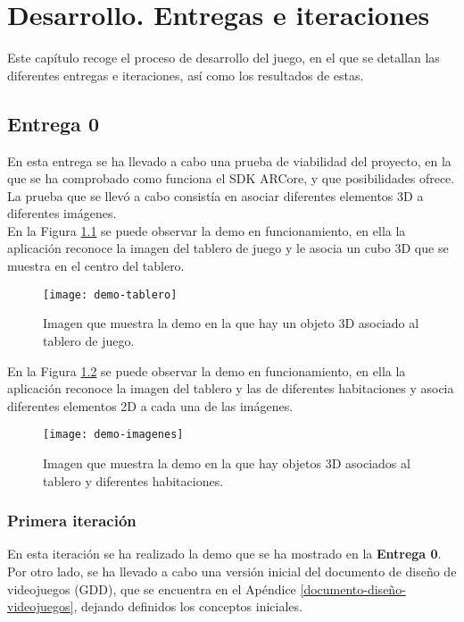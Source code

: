 \chapter{Desarrollo. Entregas e iteraciones}
\label{ch:desarrollo}
Este capítulo recoge el proceso de desarrollo del juego, en el que se detallan las diferentes entregas e iteraciones, así como los resultados de estas.

\section{Entrega 0}
En esta entrega se ha llevado a cabo una prueba de viabilidad del proyecto, en la que se ha comprobado como funciona el SDK ARCore, y que posibilidades ofrece. La prueba que se llevó a cabo consistía en asociar diferentes elementos 3D a diferentes imágenes.\\

En la Figura \ref{figura-demo-tablero} se puede observar la demo en funcionamiento, en ella la aplicación reconoce la imagen del tablero de juego y le asocia un cubo 3D que se muestra en el centro del tablero.

\begin{figure}[h]
  \centering
  \texttt{[image: demo-tablero]}
  \caption{Imagen que muestra la demo en la que hay un objeto 3D asociado al tablero de juego.}
  \label{figura-demo-tablero}
\end{figure}

En la Figura \ref{figura-demo-imagenes} se puede observar la demo en funcionamiento, en ella la aplicación reconoce la imagen del tablero y las de diferentes habitaciones y asocia diferentes elementos 2D a cada una de las imágenes.

\begin{figure}[h]
  \centering
  \texttt{[image: demo-imagenes]}
  \caption{Imagen que muestra la demo en la que hay objetos 3D asociados al tablero y diferentes habitaciones.}
  \label{figura-demo-imagenes}
\end{figure}

\FloatBarrier

\subsection{Primera iteración}
En esta iteración se ha realizado la demo que se ha mostrado en la \textbf{Entrega 0}.\\

Por otro lado, se ha llevado a cabo una versión inicial del documento de diseño de videojuegos (GDD), que se encuentra en el Apéndice \ref{documento-diseño-videojuegos}, dejando definidos los conceptos iniciales.\\

